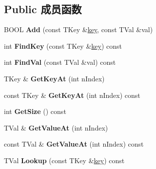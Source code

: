 \subsection*{Public 成员函数}
\begin{DoxyCompactItemize}
\item 
\mbox{\label{class_a_t_l_1_1_c_simple_map_acddf2814b2ba329b96e731ae6e818cff}} 
B\+O\+OL {\bfseries Add} (const T\+Key \&\hyperlink{structkey}{key}, const T\+Val \&val)
\item 
\mbox{\label{class_a_t_l_1_1_c_simple_map_a73eb51745dfeeb2e1769345d93471b6c}} 
int {\bfseries Find\+Key} (const T\+Key \&\hyperlink{structkey}{key}) const
\item 
\mbox{\label{class_a_t_l_1_1_c_simple_map_a911646d04161261c1d6b4f03d887c015}} 
int {\bfseries Find\+Val} (const T\+Val \&val) const
\item 
\mbox{\label{class_a_t_l_1_1_c_simple_map_a210c5349bd811ec825f0b87f8b822200}} 
T\+Key \& {\bfseries Get\+Key\+At} (int n\+Index)
\item 
\mbox{\label{class_a_t_l_1_1_c_simple_map_a0fd07e8afb4224545da24f7a9973301b}} 
const T\+Key \& {\bfseries Get\+Key\+At} (int n\+Index) const
\item 
\mbox{\label{class_a_t_l_1_1_c_simple_map_afbb2fd98aa62ef4bc64ea46defffbfdb}} 
int {\bfseries Get\+Size} () const
\item 
\mbox{\label{class_a_t_l_1_1_c_simple_map_abca465ff1519803b64b0b26dd84d9703}} 
T\+Val \& {\bfseries Get\+Value\+At} (int n\+Index)
\item 
\mbox{\label{class_a_t_l_1_1_c_simple_map_aa44357fb10ae5ce8b809c95726c553ad}} 
const T\+Val \& {\bfseries Get\+Value\+At} (int n\+Index) const
\item 
\mbox{\label{class_a_t_l_1_1_c_simple_map_a178f34418dba2f074cdc65575b92ba6f}} 
T\+Val {\bfseries Lookup} (const T\+Key \&\hyperlink{structkey}{key}) const

\end{DoxyCompactItemize}
